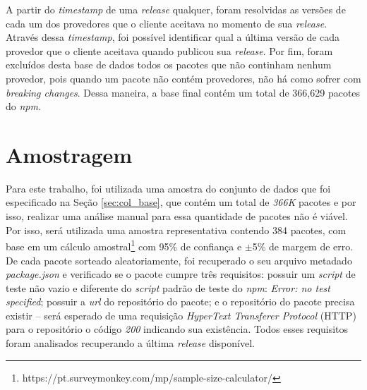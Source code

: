 A partir do \textit{timestamp} de uma \textit{release} qualquer, foram resolvidas as versões de cada um dos provedores que o cliente aceitava no momento de sua \textit{release}. Através dessa \textit{timestamp}, foi possível identificar qual a última versão de cada provedor que o cliente aceitava quando publicou sua \textit{release}. Por fim, foram excluídos desta base de dados todos os pacotes que não continham nenhum provedor, pois quando um pacote não contém provedores, não há como sofrer com \textit{breaking changes}. Dessa maneira, a base final contém um total de 366,629 pacotes do \textit{npm}.

\section{Amostragem}
\label{sec:col_amostra}
Para este trabalho, foi utilizada uma amostra do conjunto de dados que foi especificado na Seção \ref{sec:col_base}, que contém um total de \textit{366K} pacotes e por isso, realizar uma análise manual para essa quantidade de pacotes não é viável. Por isso, será utilizada uma amostra representativa contendo 384 pacotes, com base em um cálculo amostral\footnote{https://pt.surveymonkey.com/mp/sample-size-calculator/} com 95\% de confiança e $\pm$5\% de margem de erro. De cada pacote sorteado aleatoriamente, foi recuperado o seu arquivo metadado \textit{package.json} e verificado se o pacote cumpre três requisitos: possuir um \textit{script} de teste não vazio e diferente do \textit{script} padrão de teste do \textit{npm}: \textit{Error: no test specified}; possuir a \textit{url} do repositório do pacote; e o repositório do pacote precisa existir -- será esperado de uma requisição \textit{HyperText Transferer Protocol} (HTTP) para o repositório o código \textit{200} indicando sua existência. Todos esses requisitos foram analisados recuperando a última \textit{release} disponível.

